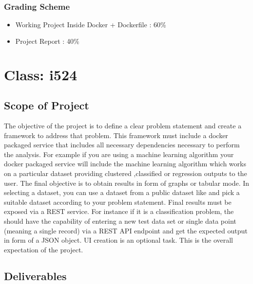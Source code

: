 \subsubsection{Grading Scheme}

\begin{itemize}
\item Working Project Inside Docker + Dockerfile : 60\%
\item Project Report : 40\%
\end{itemize}

\section{Class: i524}\label{s:i524-project}

\subsection{Scope of Project}

The objective of the project is to define a clear problem statement
and create a framework to address that problem. This framework must
include a docker packaged service that includes all necessary
dependencies necessary to perform the analysis. For example if you are
using a machine learning algorithm your docker packaged service will
include the machine learning algorithm which works on a particular
dataset providing clustered ,classified or regression outputs to the
user. The final objective is to obtain results in form of graphs or
tabular mode. In selecting a dataset, you can use a dataset from a
public dataset like 
and pick a suitable dataset according to your problem statement. Final
results must be exposed via a REST service. For instance if it is a
classification problem, the should have the capability of entering a
new test data set or single data point (meaning a single record) via a
REST API endpoint and get the expected output in form of a JSON
object. UI creation is an optional task. This is the overall
expectation of the project.

\subsection{Deliverables}

